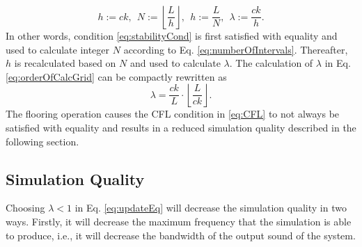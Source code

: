 \begin{equation}\label{eq:orderOfCalcGrid}
    h := ck,\ \ N := \left\lfloor\frac{L}{h}\right\rfloor, \ \ h := \frac{L}{N}, \ \ \lambda := \frac{ck}{h}.
\end{equation}
In other words, condition \eqref{eq:stabilityCond} is first satisfied with equality and used to calculate integer $N$ according to Eq. \eqref{eq:numberOfIntervals}. Thereafter, $h$ is recalculated based on $N$ and used to calculate $\lambda$. The calculation of $\lambda$ in Eq. \eqref{eq:orderOfCalcGrid} can be compactly rewritten as
\begin{equation}\label{eq:compactLambda}
    \lambda = \frac{ck}{L}\cdot\left\lfloor\frac{L}{ck}\right\rfloor.
\end{equation}
The flooring operation causes the CFL condition in \eqref{eq:CFL} to not always be satisfied with equality and results in a reduced simulation quality described in the following section.

\subsection{Simulation Quality}\label{sec:quality}
Choosing $\lambda < 1$ in Eq. \eqref{eq:updateEq} will decrease the simulation quality in two ways. Firstly, it will decrease the maximum frequency that the simulation is able to produce, i.e., it will decrease the bandwidth of the output sound of the system. 

